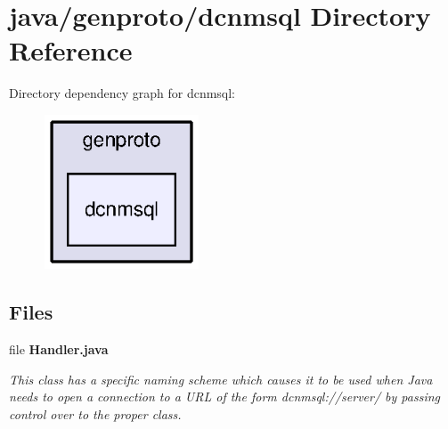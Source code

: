 \section{java/genproto/dcnmsql Directory Reference}
\label{dir_6e666b79531569a534d53eaad8139f9c}
Directory dependency graph for dcnmsql\+:\nopagebreak
\begin{figure}[H]
\begin{center}
\leavevmode
\includegraphics[width=130pt]{dir_6e666b79531569a534d53eaad8139f9c_dep}
\end{center}
\end{figure}
\subsection*{Files}
\begin{DoxyCompactItemize}
\item 
file {\bf Handler.\+java}
\begin{DoxyCompactList}\small\item\em This class has a specific naming scheme which causes it to be used when Java needs to open a connection to a U\+R\+L of the form dcnmsql\+://server/ by passing control over to the proper class. \end{DoxyCompactList}\end{DoxyCompactItemize}
